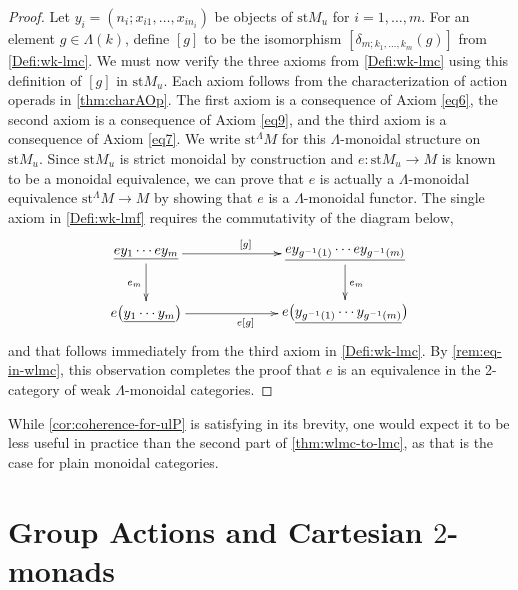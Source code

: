 \begin{proof}
Let $y_i = (n_i; x_{i1}, \ldots, x_{in_i})$ be objects of $\textrm{st} M_u$ for $i=1, \ldots, m$. For an element $g \in \Lambda(k)$, define $[g]$ to be the isomorphism $[\delta_{m; k_1, \ldots, k_m}(g)]$ from \cref{Defi:wk-lmc}.
We must now verify the three axioms from \cref{Defi:wk-lmc} using this definition of $[g]$ in $\textrm{st} M_u$.
Each axiom follows from the characterization of action operads in \cref{thm:charAOp}.
The first axiom is a consequence of Axiom \eqref{eq6}, the second axiom is a consequence of Axiom \eqref{eq9}, and the third axiom is a consequence of Axiom \eqref{eq7}. We write $\textrm{st}^{\Lambda} M$ for this $\Lambda$-monoidal structure on $\textrm{st} M_u$. Since $\textrm{st} M_u$ is strict monoidal by construction and $e \colon \textrm{st} M_u \to M$ is known to be a monoidal equivalence, we can prove that $e$ is actually a $\Lambda$-monoidal equivalence $\textrm{st}^{\Lambda} M \to M$ by showing that $e$ is a $\Lambda$-monoidal functor. The single axiom in \cref{Defi:wk-lmf} requires the commutativity of the diagram below,
 \[
        \xy
            (0,0)*+{\underline{ey_1 \cdots ey_m}}="00";
            (50,0)*+{\underline{ey_{g^{-1}(1)} \cdots ey_{g^{-1}(m)}}}="10";
            (0,-15)*+{e\big(\underline{y_1 \cdots y_m}\big)}="01";
            (50,-15)*+{e\big(\underline{y_{g^{-1}(1)} \cdots y_{g^{-1}(m)}}\big)}="11";
            {\ar^{[g]} "00" ; "10"};
            {\ar^{e_m} "10" ; "11"};
            {\ar_{e_m} "00" ; "01"};
            {\ar_{e[g]} "01" ; "11"};
        \endxy
     \]
and that follows immediately from the third axiom in \cref{Defi:wk-lmc}. By \cref{rem:eq-in-wlmc}, this observation completes the proof that $e$ is an equivalence in the 2-category of weak $\Lambda$-monoidal categories.
\end{proof}

\begin{rem}\label{rem:psELalg-vs-wlmc}
While \cref{cor:coherence-for-ulP} is satisfying in its brevity, one would expect it to be less useful in practice than the second part of \cref{thm:wlmc-to-lmc}, as that is the case for plain monoidal categories.
\end{rem}


\section{Group Actions and Cartesian $2$-monads}\label{sec:cart}


